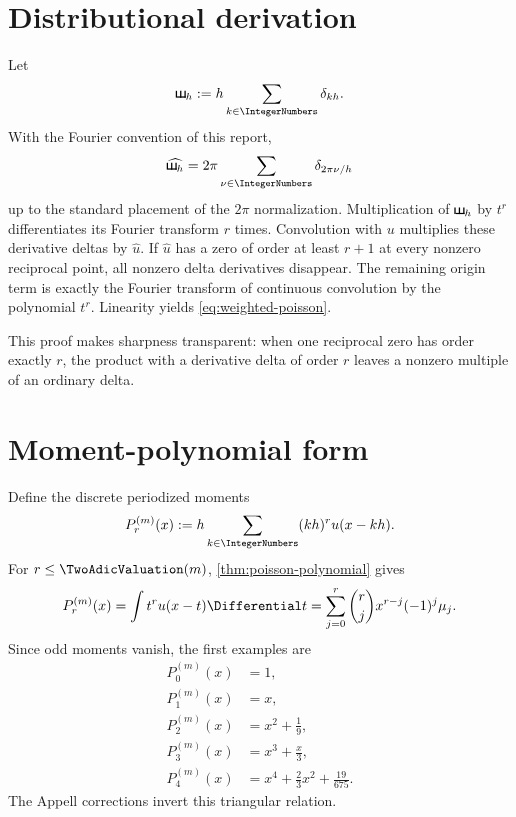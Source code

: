 \documentclass[11pt,oneside]{book}
\theoremstyle{definition}
\theoremstyle{remark}
\providecommand{\Sha}{\mathord{\vcenter{\hbox{%
  \rule[-0.05ex]{0.09em}{1.15ex}\kern0.22em
  \rule[-0.05ex]{0.09em}{1.15ex}\kern0.22em
  \rule[-0.05ex]{0.09em}{1.15ex}%
  \kern-0.62em\rule[-0.05ex]{0.62em}{0.09em}}}}}
\begin{document}
\section{Distributional derivation}
Let
\begin{equation}
 \Sha_h:=h\sum_{k\in\IntegerNumbers}\delta_{kh}.
 \label{eq:dirac-comb}
\end{equation}
With the Fourier convention of this report,
\begin{equation}
 \widehat{\Sha_h}=2\pi\sum_{\nu\in\IntegerNumbers}\delta_{2\pi\nu/h}
 \label{eq:comb-fourier}
\end{equation}
up to the standard placement of the \(2\pi\) normalization.  Multiplication of \(\Sha_h\) by \(t^r\) differentiates its Fourier transform \(r\) times.  Convolution with \(u\) multiplies these derivative deltas by \(\widehat u\).  If \(\widehat u\) has a zero of order at least \(r+1\) at every nonzero reciprocal point, all nonzero delta derivatives disappear.  The remaining origin term is exactly the Fourier transform of continuous convolution by the polynomial \(t^r\).  Linearity yields \cref{eq:weighted-poisson}.

This proof makes sharpness transparent: when one reciprocal zero has order exactly \(r\), the product with a derivative delta of order \(r\) leaves a nonzero multiple of an ordinary delta.

\section{Moment-polynomial form}
Define the discrete periodized moments
\begin{equation}
 P_r^{(m)}(x):=h\sum_{k\in\IntegerNumbers}(kh)^r u(x-kh).
 \label{eq:periodized-moments}
\end{equation}
For \(r\le\TwoAdicValuation(m)\), \cref{thm:poisson-polynomial} gives
\begin{equation}
 P_r^{(m)}(x)=\int t^ru(x-t)\Differential t
 =\sum_{j=0}^{r}\binom rj x^{r-j}(-1)^j\mu_j.
 \label{eq:periodized-moment-polynomial}
\end{equation}
Since odd moments vanish, the first examples are
\begin{align*}
 P_0^{(m)}(x)&=1,\\
 P_1^{(m)}(x)&=x,\\
 P_2^{(m)}(x)&=x^2+\frac19,\\
 P_3^{(m)}(x)&=x^3+\frac{x}{3},\\
 P_4^{(m)}(x)&=x^4+\frac23x^2+\frac{19}{675}.
\end{align*}
The Appell corrections invert this triangular relation.
\end{document}
